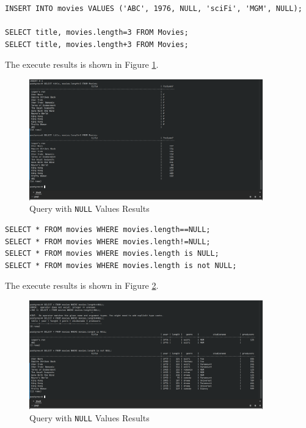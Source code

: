 \documentclass{cshwk}
\begin{document}
\begin{lstlisting}
INSERT INTO movies VALUES ('ABC', 1976, NULL, 'sciFi', 'MGM', NULL);

SELECT title, movies.length=3 FROM Movies;
SELECT title, movies.length+3 FROM Movies;
\end{lstlisting}

The execute results is shown in Figure \ref{fig:null-values}.
\begin{figure}[htbp]
    \centering
    \includegraphics[width=0.9\textwidth]{hw4-5.png}
    \caption{Query with \texttt{NULL} Values Results}
    \label{fig:null-values}
\end{figure}

\begin{lstlisting}
SELECT * FROM movies WHERE movies.length==NULL;
SELECT * FROM movies WHERE movies.length!=NULL;
SELECT * FROM movies WHERE movies.length is NULL;
SELECT * FROM movies WHERE movies.length is not NULL;
\end{lstlisting}

The execute results is shown in Figure \ref{fig:null-values-2}.
\begin{figure}[htbp]
    \centering
    \includegraphics[width=0.9\textwidth]{hw4-6.png}
    \caption{Query with \texttt{NULL} Values Results}
    \label{fig:null-values-2}
\end{figure}
\end{document}
